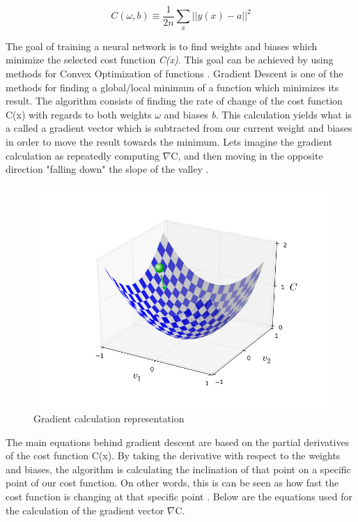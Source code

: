 \documentclass{article}
\begin{document}
$$C(\omega,b) \equiv \frac{1}{2n} \sum_{x} ||y(x) -a||^2 $$

The goal of training a neural network is to find weights and biases which minimize the selected cost function \textit{C(x)}. This goal can be achieved by using methods for Convex Optimization of functions \cite{goodfellow2014}. Gradient Descent is one of the methods for finding a global/local minimum of a function which minimizes its result. The algorithm consists of finding the rate of change of the cost function C(x) with regards to both weights $\omega$ and biases \textit{b}. This calculation yields what is a called a gradient vector which is subtracted from our current weight and biases in order to move the result towards the minimum. Lets imagine the gradient calculation as repeatedly computing $\nabla$C, and then moving in the opposite direction "falling down" the slope of the valley \cite{nielsen2016}.

\begin{figure}[h!]
\centering
	\includegraphics[scale=0.4]{valley_with_ball.png}
\caption{Gradient calculation representation \cite{nielsen2016}}
\label{fig:net_change}
\end{figure}

The main equations behind gradient descent are based on the partial derivatives of the cost function C(x). By taking the derivative with respect to the weights and biases, the algorithm is calculating the inclination of that point on a specific point of our cost function. On other words, this is can be seen as how fast the cost function is changing at that specific point \cite{nielsen2016}. Below are the equations used for the calculation of the gradient vector $\nabla$C.
\end{document}
